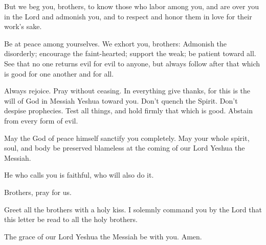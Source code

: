 \myverse{}But we beg you, brothers, to know those who labor among you,
and are over you in the Lord and admonish you,
\myverse{}and to respect and honor them in love for their work’s sake.

Be at peace among yourselves.
\myverse{}We exhort you, brothers: Admonish the disorderly; encourage the faint-hearted;
support the weak; be patient toward all.
\myverse{}See that no one returns evil for evil to anyone, but always follow after that
which is good for one another and for all.

\myverse{}Always rejoice.
\myverse{}Pray without ceasing.
\myverse{}In everything give thanks, for this is the will of God in Messiah Yeshua toward
you.
\myverse{}Don’t quench the Spirit.
\myverse{}Don’t despise prophecies.
\myverse{}Test all things, and hold firmly that which is good.
\myverse{}Abstain from every form of evil.

\myverse{}May the God of peace himself sanctify you completely. May your
whole spirit, soul, and body be preserved blameless at the coming of our Lord Yeshua the Messiah.

\myverse{}He who calls you is faithful, who will also do it.

\myverse{}Brothers, pray for us.

\myverse{}Greet all the brothers with a holy kiss.
\myverse{}I solemnly command you by the Lord that this letter be read to all the holy
brothers.

\myverse{}The grace of our Lord Yeshua the Messiah be with you. Amen.


